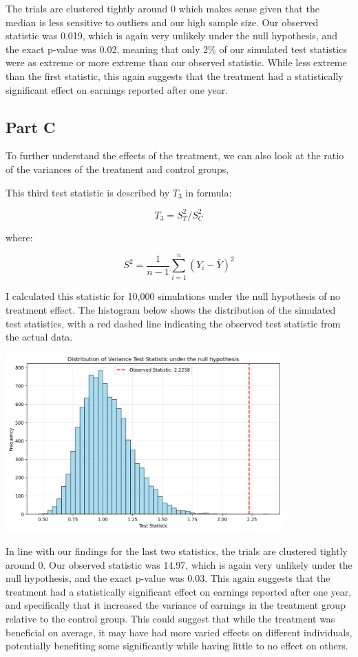 \documentclass[12pt]{article}
\begin{document}
The trials are clustered tightly around 0 which makes sense given that the median is less sensitive to outliers and our high sample size. Our observed statistic was 0.019, which is again very unlikely under the null hypothesis, and the exact p-value was 0.02, meaning that only 2\% of our simulated test statistics were as extreme or more extreme than our observed statistic. While less extreme than the first statistic, this again suggests that the treatment had a statistically significant effect on earnings reported after one year.


\subsection{Part C}

To further understand the effects of the treatment, we can also look at the ratio of the variances of the treatment and control groups, 
\newline

This third test statistic is described by $T_3$ in formula:

\[T_3 = S^2_T / S^2_C\]

where:

\[S^2 = \frac{1}{n-1} \sum_{i=1}^{n} (Y_i - \bar{Y})^2\]

I calculated this statistic for 10,000 simulations under the null hypothesis of no treatment effect. The histogram below shows the distribution of the simulated test statistics, with a red dashed line indicating the observed test statistic from the actual data.

\vspace*{2em}
\includegraphics[width=0.8\textwidth]{stat3_graph.png}
\vspace*{2em}

In line with our findings for the last two statistics, the trials are clustered tightly around 0. Our observed statistic was 14.97, which is again very unlikely under the null hypothesis, and the exact p-value was 0.03. This again suggests that the treatment had a statistically significant effect on earnings reported after one year, and specifically that it increased the variance of earnings in the treatment group relative to the control group. This could suggest that while the treatment was beneficial on average, it may have had more varied effects on different individuals, potentially benefiting some significantly while having little to no effect on others.
\end{document}
